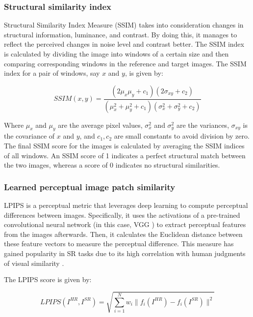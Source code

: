         \subsubsection{Structural similarity index}

            
        Structural Similarity Index Measure (SSIM) takes into consideration changes in structural information, luminance, and contrast. By doing this, it manages to reflect the perceived changes in noise level and contrast better.
        The SSIM index is calculated by dividing the image into windows of a certain size and then comparing corresponding windows in the reference and target images. The SSIM index for a pair of windows, say $x$ and $y$, is given by:
        
        \begin{equation}
            SSIM(x, y) = \frac{(2\mu_x\mu_y + c_1)(2\sigma_{xy} + c_2)}{(\mu_x^2 + \mu_y^2 + c_1)(\sigma_x^2 + \sigma_y^2 + c_2)}
        \end{equation}
        
        Where $\mu_x$ and $\mu_y$ are the average pixel values, $\sigma_x^2$ and $\sigma_y^2$ are the variances, $\sigma_{xy}$ is the covariance of $x$ and $y$, and $c_1, c_2$ are small constants to avoid division by zero.
        The final SSIM score for the images is calculated by averaging the SSIM indices of all windows. An SSIM score of 1 indicates a perfect structural match between the two images, whereas a score of 0 indicates no structural similarities.

        \subsubsection{Learned perceptual image patch similarity}

        LPIPS is a perceptual metric that leverages deep learning to compute perceptual differences between images. Specifically, it uses the activations of a pre-trained convolutional neural network (in this case, VGG \cite{VGGnet} ) to extract perceptual features from the images afterwards. 
        Then, it calculates the Euclidean distance between these feature vectors to measure the perceptual difference.
        This measure has gained popularity in SR tasks due to its high correlation with human judgments of visual similarity \cite{zhang2018unreasonable}.
        
        The LPIPS score is given by:
        
        \begin{equation}
        LPIPS(I^{HR}, I^{SR}) = \sqrt{\sum_{i=1}^{N} w_i\|f_i(I^{HR})-f_i(I^{SR})\|^2}
        \end{equation}
        
